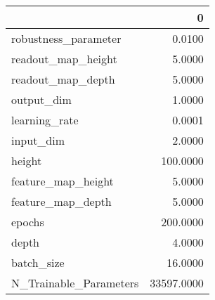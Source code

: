 \begin{tabular}{lr}
\toprule
{} &           0 \\
\midrule
robustness\_parameter   &      0.0100 \\
readout\_map\_height     &      5.0000 \\
readout\_map\_depth      &      5.0000 \\
output\_dim             &      1.0000 \\
learning\_rate          &      0.0001 \\
input\_dim              &      2.0000 \\
height                 &    100.0000 \\
feature\_map\_height     &      5.0000 \\
feature\_map\_depth      &      5.0000 \\
epochs                 &    200.0000 \\
depth                  &      4.0000 \\
batch\_size             &     16.0000 \\
N\_Trainable\_Parameters &  33597.0000 \\
\bottomrule
\end{tabular}

